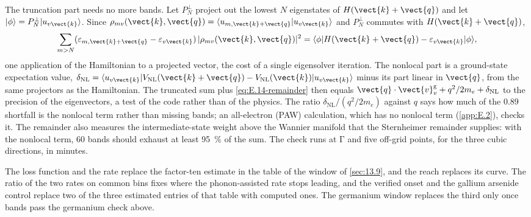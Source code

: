 The truncation part needs no more bands. Let $P^\perp_N$ project out the lowest $N$ eigenstates of $H(\vect{k}+\vect{q})$ and let $|\phi\rangle = P^\perp_N|u_{v\vect{k}}\rangle$. Since $\rho_{mv}(\vect{k},\vect{q}) = \langle u_{m,\vect{k}+\vect{q}}|u_{v\vect{k}}\rangle$ and $P^\perp_N$ commutes with $H(\vect{k}+\vect{q})$,
\begin{equation}
  \sum_{m>N}(\varepsilon_{m,\vect{k}+\vect{q}} - \varepsilon_{v\vect{k}})\,|\rho_{mv}(\vect{k},\vect{q})|^2 = \langle\phi|H(\vect{k}+\vect{q}) - \varepsilon_{v\vect{k}}|\phi\rangle ,
  \label{eq:E.14-remainder}
\end{equation}
one application of the Hamiltonian to a projected vector, the cost of a single eigensolver iteration. The nonlocal part is a ground-state expectation value, $\delta_{\mathrm{NL}} = \langle u_{v\vect{k}}|V_{\mathrm{NL}}(\vect{k}+\vect{q}) - V_{\mathrm{NL}}(\vect{k})|u_{v\vect{k}}\rangle$ minus its part linear in $\vect{q}$, from the same projectors as the Hamiltonian. The truncated sum plus \cref{eq:E.14-remainder} then equals $\vect{q}\cdot\vect{v}^{\mathrm{g}}_v + q^2/2m_e + \delta_{\mathrm{NL}}$ to the precision of the eigenvectors, a test of the code rather than of the physics. The ratio $\delta_{\mathrm{NL}}/(q^2/2m_e)$ against $q$ says how much of the 0.89 shortfall is the nonlocal term rather than missing bands; an all-electron (PAW) calculation, which has no nonlocal term (\cref{app:E.2}), checks it. The remainder also measures the intermediate-state weight above the Wannier manifold that the Sternheimer remainder supplies: with the nonlocal term, 60 bands should exhaust at least \SI{95}{\percent} of the sum. The check runs at $\mathrm{\Gamma}$ and five off-grid points, for the three cubic directions, in minutes.

The loss function and the rate replace the factor-ten estimate in the table of the window of \cref{sec:13.9}, and the reach replaces its curve. The ratio of the two rates on common bins fixes where the phonon-assisted rate stops leading, and the verified onset and the gallium arsenide control replace two of the three estimated entries of that table with computed ones. The germanium window replaces the third only once bands pass the germanium check above.

